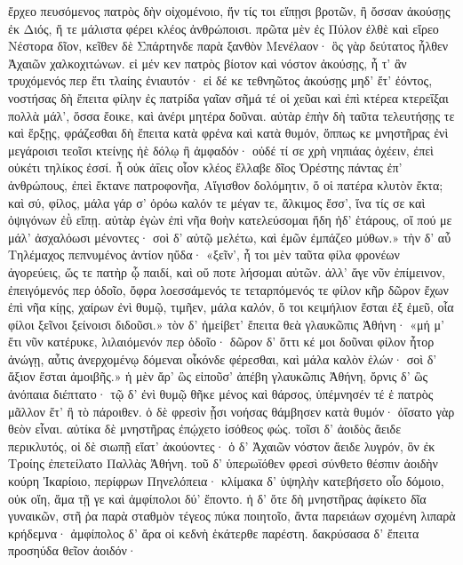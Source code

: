 ἔρχεο πευσόμενος πατρὸς δὴν οἰχομένοιο,
ἤν τίς τοι εἴπῃσι βροτῶν, ἢ ὄσσαν ἀκούσῃς
ἐκ Διός, ἥ τε μάλιστα φέρει κλέος ἀνθρώποισι.
πρῶτα μὲν ἐς Πύλον ἐλθὲ καὶ εἴρεο Νέστορα δῖον,
κεῖθεν δὲ Σπάρτηνδε παρὰ ξανθὸν Μενέλαον·
ὃς γὰρ δεύτατος ἦλθεν Ἀχαιῶν χαλκοχιτώνων.
εἰ μέν κεν πατρὸς βίοτον καὶ νόστον ἀκούσῃς,
ἦ τ' ἂν τρυχόμενός περ ἔτι τλαίης ἐνιαυτόν·
εἰ δέ κε τεθνηῶτος ἀκούσῃς μηδ' ἔτ' ἐόντος,
νοστήσας δὴ ἔπειτα φίλην ἐς πατρίδα γαῖαν    
σῆμά τέ οἱ χεῦαι καὶ ἐπὶ κτέρεα κτερεΐξαι
πολλὰ μάλ', ὅσσα ἔοικε, καὶ ἀνέρι μητέρα δοῦναι.
αὐτὰρ ἐπὴν δὴ ταῦτα τελευτήσῃς τε καὶ ἕρξῃς,
φράζεσθαι δὴ ἔπειτα κατὰ φρένα καὶ κατὰ θυμόν,
ὅππως κε μνηστῆρας ἐνὶ μεγάροισι τεοῖσι
κτείνῃς ἠὲ δόλῳ ἢ ἀμφαδόν· οὐδέ τί σε χρὴ
νηπιάας ὀχέειν, ἐπεὶ οὐκέτι τηλίκος ἐσσί.
ἦ οὐκ ἀΐεις οἷον κλέος ἔλλαβε δῖος Ὀρέστης
πάντας ἐπ' ἀνθρώπους, ἐπεὶ ἔκτανε πατροφονῆα,
Αἴγισθον δολόμητιν, ὅ οἱ πατέρα κλυτὸν ἔκτα;    
καὶ σύ, φίλος, μάλα γάρ σ' ὁρόω καλόν τε μέγαν τε,
ἄλκιμος ἔσσ', ἵνα τίς σε καὶ ὀψιγόνων ἐῢ εἴπῃ.
αὐτὰρ ἐγὼν ἐπὶ νῆα θοὴν κατελεύσομαι ἤδη
ἠδ' ἑτάρους, οἵ πού με μάλ' ἀσχαλόωσι μένοντες·
σοὶ δ' αὐτῷ μελέτω, καὶ ἐμῶν ἐμπάζεο μύθων.»
\nstanza
τὴν δ' αὖ Τηλέμαχος πεπνυμένος ἀντίον ηὔδα·
«ξεῖν', ἦ τοι μὲν ταῦτα φίλα φρονέων ἀγορεύεις,
ὥς τε πατὴρ ᾧ παιδί, καὶ οὔ ποτε λήσομαι αὐτῶν.
ἀλλ' ἄγε νῦν ἐπίμεινον, ἐπειγόμενός περ ὁδοῖο,
ὄφρα λοεσσάμενός τε τεταρπόμενός τε φίλον κῆρ    
δῶρον ἔχων ἐπὶ νῆα κίῃς, χαίρων ἐνὶ θυμῷ,
τιμῆεν, μάλα καλόν, ὅ τοι κειμήλιον ἔσται
ἐξ ἐμεῦ, οἷα φίλοι ξεῖνοι ξείνοισι διδοῦσι.»
\nstanza
τὸν δ' ἠμείβετ' ἔπειτα θεὰ γλαυκῶπις Ἀθήνη·
«μή μ' ἔτι νῦν κατέρυκε, λιλαιόμενόν περ ὁδοῖο·
δῶρον δ' ὅττι κέ μοι δοῦναι φίλον ἦτορ ἀνώγῃ,
αὖτις ἀνερχομένῳ δόμεναι οἶκόνδε φέρεσθαι,
καὶ μάλα καλὸν ἑλών· σοὶ δ' ἄξιον ἔσται ἀμοιβῆς.»
\nstanza
ἡ μὲν ἄρ' ὣς εἰποῦσ' ἀπέβη γλαυκῶπις Ἀθήνη,
ὄρνις δ' ὣς ἀνόπαια διέπτατο· τῷ δ' ἐνὶ θυμῷ    
θῆκε μένος καὶ θάρσος, ὑπέμνησέν τέ ἑ πατρὸς
μᾶλλον ἔτ' ἢ τὸ πάροιθεν. ὁ δὲ φρεσὶν ᾗσι νοήσας
θάμβησεν κατὰ θυμόν· ὀΐσατο γὰρ θεὸν εἶναι.
αὐτίκα δὲ μνηστῆρας ἐπῴχετο ἰσόθεος φώς.
\nstanza
τοῖσι δ' ἀοιδὸς ἄειδε περικλυτός, οἱ δὲ σιωπῇ
εἵατ' ἀκούοντες· ὁ δ' Ἀχαιῶν νόστον ἄειδε
λυγρόν, ὃν ἐκ Τροίης ἐπετείλατο Παλλὰς Ἀθήνη.
\nstanza
τοῦ δ' ὑπερωϊόθεν φρεσὶ σύνθετο θέσπιν ἀοιδὴν
κούρη Ἰκαρίοιο, περίφρων Πηνελόπεια·
κλίμακα δ' ὑψηλὴν κατεβήσετο οἷο δόμοιο,    
οὐκ οἴη, ἅμα τῇ γε καὶ ἀμφίπολοι δύ' ἕποντο.
ἡ δ' ὅτε δὴ μνηστῆρας ἀφίκετο δῖα γυναικῶν,
στῆ ῥα παρὰ σταθμὸν τέγεος πύκα ποιητοῖο,
ἄντα παρειάων σχομένη λιπαρὰ κρήδεμνα·
ἀμφίπολος δ' ἄρα οἱ κεδνὴ ἑκάτερθε παρέστη.
δακρύσασα δ' ἔπειτα προσηύδα θεῖον ἀοιδόν·
